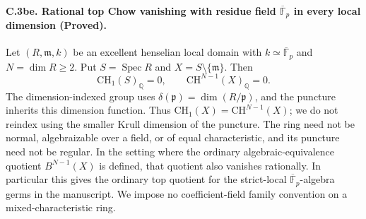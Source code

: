\paragraph{C.3be. Rational top Chow vanishing with residue field
\(\overline{\mathbb F}_p\) in every local dimension (Proved).}
Let \((R,\mathfrak m,k)\) be an excellent henselian local domain
with \(k\simeq\overline{\mathbb F}_p\) and \(N=\dim R\geq2\).
Put \(S=\operatorname{Spec}R\) and
\(X=S\setminus\{\mathfrak m\}\). Then
\begin{equation}\label{eq:C3be-top-vanishing}
              \mathrm{CH}_1(S)_{\mathbb Q}=0,
              \qquad \mathrm{CH}^{N-1}(X)_{\mathbb Q}=0.
\end{equation}
The dimension-indexed group uses
\(\delta(\mathfrak p)=\dim(R/\mathfrak p)\), and the puncture
inherits this dimension function. Thus
\(\mathrm{CH}_1(X)=\mathrm{CH}^{N-1}(X)\); we do not reindex
using the smaller Krull dimension of the puncture.
The ring need not be normal, algebraizable over a field, or of
equal characteristic, and its puncture need not be regular.
In the setting where the ordinary algebraic-equivalence quotient
\(B^{N-1}(X)\) is defined, that quotient also vanishes rationally.
In particular this gives the ordinary top quotient for the
strict-local \(\overline{\mathbb F}_p\)-algebra germs in the
manuscript. We impose no coefficient-field family convention on
a mixed-characteristic ring.


